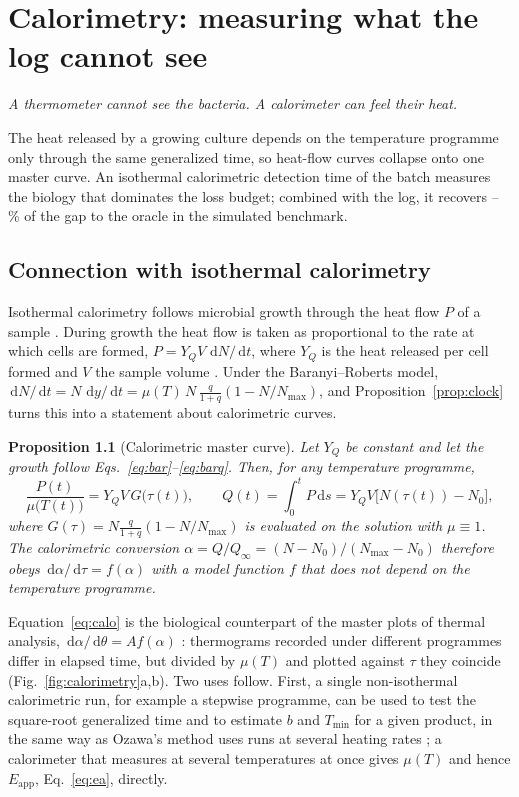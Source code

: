 \documentclass[11pt,a4paper,twoside,openany]{book}
\newcommand{\hook}[1]{{\noindent\fontsize{14}{20}\selectfont\itshape\color{dggrey}#1\par}\vspace{14pt}}
\newcommand{\dd}{\,\mathrm{d}}
\theoremstyle{plain}\newtheorem{proposition}{Proposition}\newtheorem{corollary}{Corollary}
\theoremstyle{definition}\newtheorem{definition}{Definition}[chapter]
\begin{document}
\chapter{Calorimetry: measuring what the log cannot see}\label{ch:calo}
\hook{A thermometer cannot see the bacteria. A calorimeter can feel their heat.}
\begin{summary}
The heat released by a growing culture depends on the temperature programme only through the same generalized time, so heat-flow curves collapse onto one master curve. An isothermal calorimetric detection time of the batch measures the biology that dominates the loss budget; combined with the log, it recovers \CalFracMin--\CalFracMax\,\% of the gap to the oracle in the simulated benchmark.
\end{summary}
\section{Connection with isothermal calorimetry}\label{sec:calotheory}
Isothermal calorimetry follows microbial growth through the heat flow $P$ of a sample \cite{wadso2011,fessas2017,schiraldi2019}. During growth the heat flow is taken as proportional to the rate at which cells are formed, $P=Y_Q V\,\dd N/\dd t$, where $Y_Q$ is the heat released per cell formed and $V$ the sample volume \cite{fessas2017,fricke2020}. Under the Baranyi--Roberts model, $\dd N/\dd t=N\,\dd y/\dd t=\mu(T)\,N\,\frac{q}{1+q}(1-N/N_{\max})$, and Proposition~\ref{prop:clock} turns this into a statement about calorimetric curves.

\begin{proposition}[Calorimetric master curve]\label{prop:calo}
Let $Y_Q$ be constant and let the growth follow Eqs.~\eqref{eq:bar}--\eqref{eq:barq}. Then, for any temperature programme,
\begin{equation}\label{eq:calo}
\frac{P(t)}{\mu\big(T(t)\big)}=Y_QV\,G\big(\tau(t)\big),\qquad Q(t)=\int_0^tP\dd s=Y_QV\big[N(\tau(t))-N_0\big],
\end{equation}
where $G(\tau)=N\frac{q}{1+q}(1-N/N_{\max})$ is evaluated on the solution with $\mu\equiv1$. The calorimetric conversion $\alpha=Q/Q_\infty=(N-N_0)/(N_{\max}-N_0)$ therefore obeys $\dd\alpha/\dd\tau=f(\alpha)$ with a model function $f$ that does not depend on the temperature programme.
\end{proposition}

Equation~\eqref{eq:calo} is the biological counterpart of the master plots of thermal analysis, $\dd\alpha/\dd\theta=Af(\alpha)$ \cite{malek2013,koga2013}: thermograms recorded under different programmes differ in elapsed time, but divided by $\mu(T)$ and plotted against $\tau$ they coincide (Fig.~\ref{fig:calorimetry}a,b). Two uses follow. First, a single non-isothermal calorimetric run, for example a stepwise programme, can be used to test the square-root generalized time and to estimate $b$ and $T_{\min}$ for a given product, in the same way as Ozawa's method uses runs at several heating rates \cite{ozawa1965,koga2013}; a calorimeter that measures at several temperatures at once \cite{wadso2011} gives $\mu(T)$ and hence $E_{\mathrm{app}}$, Eq.~\eqref{eq:ea}, directly.
\end{document}
